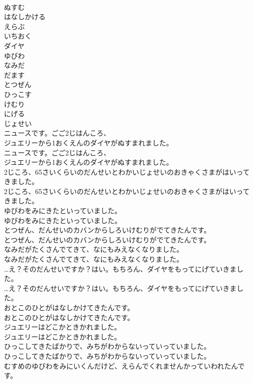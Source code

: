 \documentclass[8pt]{extreport}
\begin{document}
\begin{CJK}{UTF8}{min}
\\	ぬすむ
\\	はなしかける
\\	えらぶ
\\	いちおく
\\	ダイヤ
\\	ゆびわ
\\	なみだ
\\	だます
\\	とつぜん
\\	ひっこす
\\	けむり
\\	にげる
\\	じょせい
\\	ニュースです。ごご2じはんころ、
\\	ジュエリーから1おくえんのダイヤがぬすまれました。	
\\	ニュースです。ごご2じはんころ、
\\	ジュエリーから1おくえんのダイヤがぬすまれました。 
\\	2じころ、65さいくらいのだんせいとわかいじょせいのおきゃくさまがはいってきました。	
\\	2じころ、65さいくらいのだんせいとわかいじょせいのおきゃくさまがはいってきました。 
\\	ゆびわをみにきたといっていました。	
\\	ゆびわをみにきたといっていました。 
\\	とつぜん、だんせいのカバンからしろいけむりがでてきたんです。	
\\	とつぜん、だんせいのカバンからしろいけむりがでてきたんです。 
\\	なみだがたくさんでてきて、なにもみえなくなりました。	
\\	なみだがたくさんでてきて、なにもみえなくなりました。 
\\	…え？そのだんせいですか？はい。もちろん、ダイヤをもってにげていきました。	
\\	…え？そのだんせいですか？はい。もちろん、ダイヤをもってにげていきました。 
\\	おとこのひとがはなしかけてきたんです。	
\\	おとこのひとがはなしかけてきたんです。 
\\	ジュエリーはどこかときかれました。	
\\	ジュエリーはどこかときかれました。 
\\	ひっこしてきたばかりで、みちがわからないっていっていました。	
\\	ひっこしてきたばかりで、みちがわからないっていっていました。 
\\	むすめのゆびわをみにいくんだけど、えらんでくれませんかっていわれたんです。	

\end{CJK}
\end{document}
